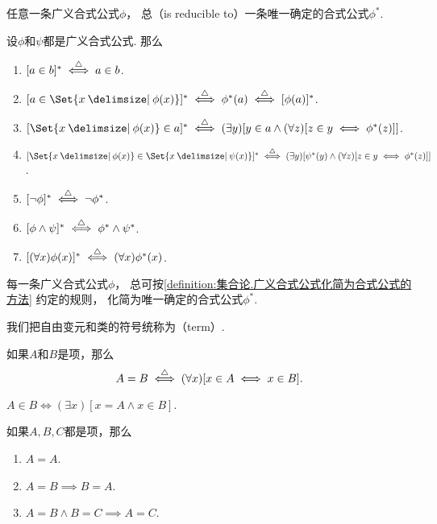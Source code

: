 任意一条广义合式公式\(\phi\)，
总（is reducible to）一条唯一确定的合式公式\(\phi^*\).
\begin{definition}\label{definition:集合论.广义合式公式化简为合式公式的方法}
设\(\phi\)和\(\psi\)都是广义合式公式.
\def\A{\Set{ x \given \phi(x) }}
\def\B{\Set{ x \given \psi(x) }}
那么\begin{enumerate}
	\item \([a \in b]^* \overset{\triangle}{\iff} a \in b\).
	\item \([a \in \A]^* \defiff \phi^*(a) \defiff [\phi(a)]^*\).
	\item \([\A \in a]^* \defiff (\exists y)[y \in a \land (\forall z)[z \in y \iff \phi^*(z)]]\).
	\item \([\A \in \B]^* \defiff (\exists y)[\psi^*(y) \land (\forall z)[z \in y \iff \phi^*(z)]]\).
	\item \([\neg\phi]^* \defiff \neg\phi^*\).
	\item \([\phi\land\psi]^* \defiff \phi^*\land\psi^*\).
	\item \([(\forall x)\phi(x)]^* \defiff (\forall x)\phi^*(x)\).
\end{enumerate}
\end{definition}

\begin{theorem}
每一条广义合式公式\(\phi\)，
总可按\cref{definition:集合论.广义合式公式化简为合式公式的方法} 约定的规则，
化简为唯一确定的合式公式\(\phi^*\).
\end{theorem}

我们把自由变元和类的符号统称为（term）.
\begin{definition}
如果\(A\)和\(B\)是项，那么\[
	A=B \overset{\triangle}{\iff} (\forall x)[x \in A \iff x \in B].
\]
\end{definition}

\begin{theorem}
\(A \in B \iff (\exists x)[x = A \land x \in B]\).
\end{theorem}

\begin{theorem}
如果\(A,B,C\)都是项，那么\begin{enumerate}
	\item \(A=A\).
	\item \(A=B \implies B=A\).
	\item \(A=B \land B=C \implies A=C\).
\end{enumerate}
\end{theorem}

